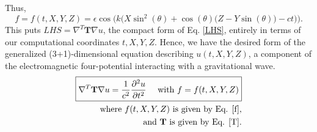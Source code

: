 \documentclass{article}
\begin{document}
Thus, \begin{equation} \label{f}
f=f(t,X,Y,Z)=\epsilon \cos\big(k\big(X \sin ^2(\theta )+\cos (\theta ) \big(Z-Y \sin (\theta )\big)-ct\big)\big).
\end{equation}
This puts $LHS = \nabla^T \textbf{T} \nabla u$, the compact form of Eq. \ref{LHS}, entirely in terms of our computational coordinates $t,X,Y,Z$. Hence, we have the desired form of the generalized (3+1)-dimensional equation describing $u(t,X,Y,Z)$, a component of the electromagnetic four-potential interacting with a gravitational wave.
\begin{align}\label{main eqn}
\boxed{
\nabla^T \textbf{T} \nabla u = \frac{1}{c^2}\frac{\partial^2 u}{\partial t^2} \ \ \ \ \mbox{with } f=f(t,X,Y,Z)
}\\
\text{where $f(t,X,Y,Z)$ is given by Eq. \ref{f},} \nonumber \\
\text{and $\textbf{T}$ is given by Eq. \ref{T}.} \nonumber
\end{align}
\end{document}
